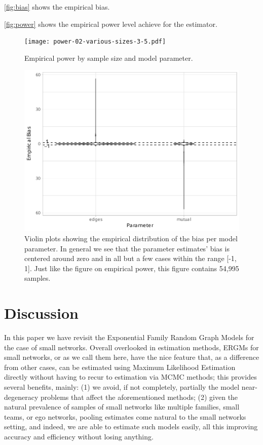 \documentclass[12pt]{article}
\begin{document}
\autoref{fig:bias} shows the empirical bias.

\autoref{fig:power} shows the empirical power level achieve for the estimator.

\begin{figure}
	\centering
	\caption{\label{fig:power}Empirical power by sample size and model parameter.}
	\texttt{[image: power-02-various-sizes-3-5.pdf]}
\end{figure}

\begin{figure}
    \centering
    \caption{\label{fig:bias}Violin plots showing the empirical distribution of the bias per model parameter. In general we see that the parameter estimates' bias is centered around zero and in all but a few cases within the range [-1, 1]. Just like the figure on empirical power, this figure contains 54,995 samples.}
    \includegraphics[width=.8\linewidth]{figures/bias-02-various-sizes-3-5.pdf}
\end{figure}

\pagebreak
\section{Discussion}

In this paper we have revisit the Exponential Family Random Graph Models for the case of small networks. Overall overlooked in estimation methods, ERGMs for small networks, or \ergmitos{} as we call them here, have the nice feature that, as a difference from other cases, can be estimated using Maximum Likelihood Estimation directly without having to recur to estimation via MCMC methods; this provides several benefits, mainly: (1) we avoid, if not completely, partially the model near-degeneracy problems that affect the aforementioned methods; (2) given the natural prevalence of samples of small networks like multiple families, small teams, or ego networks, pooling estimates come natural to the small networks setting, and indeed, we are able to estimate such models easily, all this improving accuracy and efficiency without losing anything.
\end{document}
